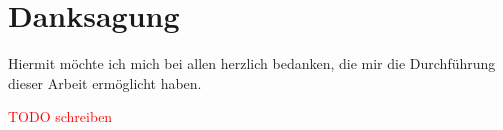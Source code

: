 \chapter{Danksagung}

Hiermit  möchte  ich  mich  bei  allen  herzlich  bedanken,  die  mir  die Durchführung  dieser  Arbeit ermöglicht haben. 

\textcolor{red}{TODO schreiben}

